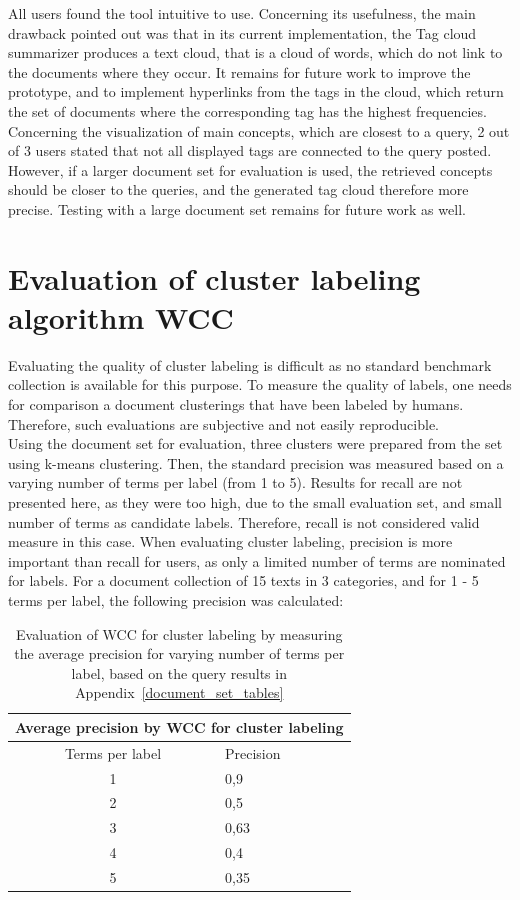 All users found the tool intuitive to use. Concerning its usefulness, the main drawback pointed out was that in its current implementation, the Tag cloud summarizer produces a text cloud, that is a cloud of words, which do not link to the documents where they occur. It remains for future work to improve the prototype, and to implement hyperlinks from the tags in the cloud, which return the set of documents where the corresponding tag has the highest frequencies. Concerning the visualization of main concepts, which are closest to a query, 2 out of 3 users stated that not all displayed tags are connected to the query posted. However, if a larger document set for evaluation is used, the retrieved concepts should be closer to the queries, and the generated tag cloud therefore more precise. Testing with a large document set remains for future work as well. 

\section{Evaluation of cluster labeling algorithm WCC}
Evaluating the quality of cluster labeling is difficult as no standard benchmark collection is available for this purpose. To measure the quality of labels, one needs for comparison a document clusterings that have been labeled by humans. Therefore, such evaluations are subjective and not easily reproducible. \\

Using the document set for evaluation, three clusters were prepared from the set using k-means clustering. Then, the standard precision was measured based on a varying number of terms per label (from 1 to 5). Results for recall are not presented here, as they were too high, due to the small evaluation set, and small number of terms as candidate labels. Therefore, recall is not considered valid measure in this case. When evaluating cluster labeling, precision is more important than recall for users, as only a limited number of terms are nominated for labels. For a document collection of 15 texts in 3 categories, and for 1 - 5 terms per label, the following precision was calculated:\\

\begin{table}[H]
\centering
\begin{tabular}{c l }
\hline
\multicolumn{2}{c}{Average precision by WCC for cluster labeling} \\
\hline
Terms per label & Precision \\
\hline
1 & 0,9  \\
2 & 0,5  \\
3 & 0,63 \\
4 & 0,4  \\
5 & 0,35  \\
\hline
\end{tabular}
\caption[Precision by WCC for cluster labeling]{Evaluation of WCC for cluster labeling by measuring the average precision for varying number of terms per label, based on the query results in Appendix~\ref{document_set_tables}}
\end{table}

